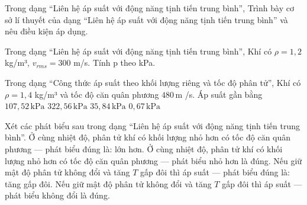 \begin{ex}
Trong dạng “Liên hệ áp suất với động năng tịnh tiến trung bình”, Trình bày cơ sở lí thuyết của dạng “Liên hệ áp suất với động năng tịnh tiến trung bình” và nêu điều kiện áp dụng.
\choiceTF

\end{ex}

\begin{ex}
Trong dạng “Liên hệ áp suất với động năng tịnh tiến trung bình”, Khí có $\rho=1,2$ kg/m³, $v_{rms}=300$ m/s. Tính p theo kPa.
\end{ex}

\begin{ex}
Trong dạng “Công thức áp suất theo khối lượng riêng và tốc độ phân tử”, Khí có $\rho=1,4$ kg/m³ và tốc độ căn quân phương $480\,\text{m}$ /s. Áp suất gần bằng
\choice
{\True $107,52\,\text{kPa}$}
{$322,56\,\text{kPa}$}
{$35,84\,\text{kPa}$}
{$0,67\,\text{kPa}$}
\end{ex}

\begin{ex}
Xét các phát biểu sau trong dạng “Liên hệ áp suất với động năng tịnh tiến trung bình”.
\choiceTF
{\True Ở cùng nhiệt độ, phân tử khí có khối lượng nhỏ hơn có tốc độ căn quân phương — phát biểu đúng là: lớn hơn.}
{Ở cùng nhiệt độ, phân tử khí có khối lượng nhỏ hơn có tốc độ căn quân phương — phát biểu nhỏ hơn là đúng.}
{\True Nếu giữ mật độ phân tử không đổi và tăng $T$ gấp đôi thì áp suất — phát biểu đúng là: tăng gấp đôi.}
{Nếu giữ mật độ phân tử không đổi và tăng $T$ gấp đôi thì áp suất — phát biểu không đổi là đúng.}
\end{ex}

